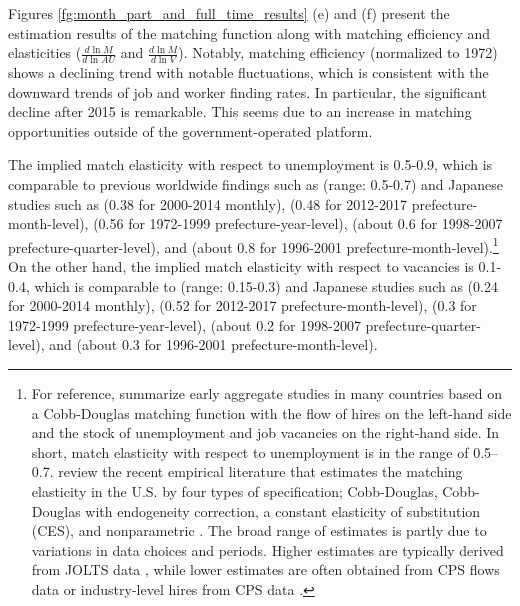 \documentclass[12pt]{article}
\begin{document}
Figures \ref{fg:month_part_and_full_time_results} (e) and (f) present the estimation results of the matching function along with matching efficiency and elasticities (\(\frac{d\ln M}{d\ln AU}\) and \(\frac{d\ln M}{d\ln V}\)). Notably, matching efficiency (normalized to 1972) shows a declining trend with notable fluctuations, which is consistent with the downward trends of job and worker finding rates. 
In particular, the significant decline after 2015 is remarkable.
This seems due to an increase in matching opportunities outside of the government-operated platform.

The implied match elasticity with respect to unemployment is 0.5-0.9, which is comparable to previous worldwide findings such as \cite{petrongolo2001looking} (range: 0.5-0.7) and Japanese studies such as \cite{higashi2018spatial} (0.38 for 2000-2014 monthly), \cite{kawata2019} (0.48 for 2012-2017 prefecture-month-level), \cite{kano2005estimating} (0.56 for 1972-1999 prefecture-year-level), \cite{sasaki2007measuring} (about 0.6 for 1998-2007 prefecture-quarter-level), and \cite{kambayashi2006vacancy} (about 0.8 for 1996-2001 prefecture-month-level).\footnote{For reference, \cite{petrongolo2001looking} summarize early aggregate studies in many countries based on a Cobb-Douglas matching function with the flow of hires on the left-hand side and the stock of unemployment and job vacancies on the right-hand side. In short, match elasticity with respect to unemployment is in the range of 0.5–0.7. \cite{bernstein2022matching} review the recent empirical literature that estimates the matching elasticity in the U.S. by four types of specification; Cobb-Douglas, Cobb-Douglas with endogeneity correction, a constant elasticity of substitution (CES), and nonparametric \citep{lange2020beyond}. The broad range of estimates is partly due to variations in data choices and periods. Higher estimates are typically derived from JOLTS data \citep{borowczyk2013accounting, csahin2014mismatch}, while lower estimates are often obtained from CPS flows data \citep{barnichon2015labor} or industry-level hires from CPS data \citep{csahin2014mismatch}.}
On the other hand, the implied match elasticity with respect to vacancies is 0.1-0.4, which is comparable to \cite{lange2020beyond} (range: 0.15-0.3) and Japanese studies such as \cite{higashi2018spatial} (0.24 for 2000-2014 monthly), \cite{kawata2019} (0.52 for 2012-2017 prefecture-month-level), \cite{kano2005estimating} (0.3 for 1972-1999 prefecture-year-level), \cite{sasaki2007measuring} (about 0.2 for 1998-2007 prefecture-quarter-level), and \cite{kambayashi2006vacancy} (about 0.3 for 1996-2001 prefecture-month-level).
\end{document}
